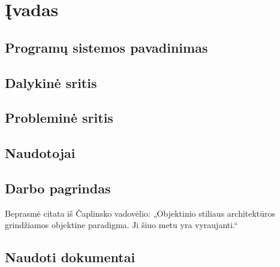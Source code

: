 \chapter{Įvadas}


\section{Programų sistemos pavadinimas}

\section{Dalykinė sritis}

\section{Probleminė sritis}

\section{Naudotojai}

\section{Darbo pagrindas}

Beprasmė citata iš Čaplinsko vadovėlio: „Objektinio stiliaus architektūros
grindžiamos objektine paradigma. Ji šiuo metu yra 
vyraujanti.“\cite[50]{cap_psi2}

\section{Naudoti dokumentai}

